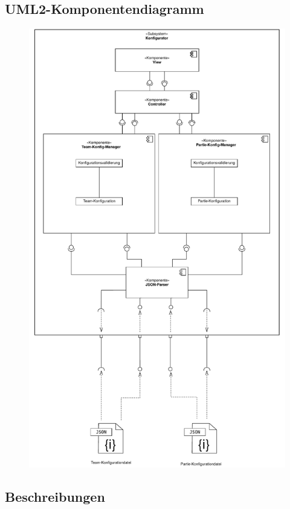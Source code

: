 \subsection{UML2-Komponentendiagramm}

\begin{figure}[H]
    \centering
    \includegraphics[scale=0.6]{images/Konfigurator.pdf}
\end{figure}

\subsection{Beschreibungen}

